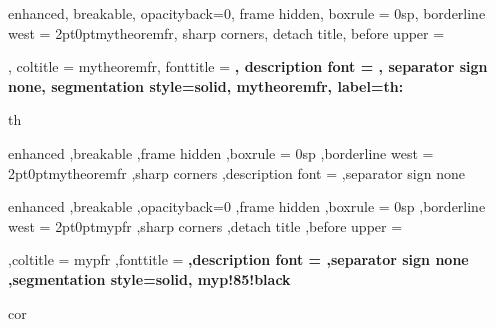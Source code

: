 \usepackage{tikzsymbols}
\usepackage{fontawesome5}
\renewcommand\qedsymbol{\faDiceD20}

{%
	enhanced,
	breakable,
	opacityback=0,
	frame hidden,
	boxrule = 0sp,
	borderline west = {2pt}{0pt}{mytheoremfr},
	sharp corners,
	detach title,
	before upper = \tcbtitle\par\smallskip,
	coltitle = mytheoremfr,
	fonttitle = \bfseries\sffamily,
	description font = \mdseries,
	separator sign none,
	segmentation style={solid, mytheoremfr},
    label={th:\thetcbcounter}
}
{th}

{%
	enhanced
	,breakable
	,frame hidden
	,boxrule = 0sp
	,borderline west = {2pt}{0pt}{mytheoremfr}
	,sharp corners
	,description font = \mdseries
	,separator sign none
}
{%
	enhanced
	,breakable
	,opacityback=0
	,frame hidden
	,boxrule = 0sp
	,borderline west = {2pt}{0pt}{mypfr}
	,sharp corners
	,detach title
	,before upper = \tcbtitle\par\smallskip
	,coltitle = mypfr
	,fonttitle = \bfseries\sffamily
	,description font = \mdseries
	,separator sign none
	,segmentation style={solid, myp!85!black}
}{cor}

